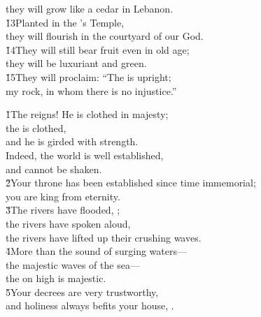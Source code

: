 \begin{poetry}
\poemll    they will grow like a cedar in Lebanon. \\
\poeml \v{13}Planted in the 's Temple, \\
\poemll    they will flourish in the courtyard of our God. \\
\poeml \v{14}They will still bear fruit even in old age; \\
\poemll    they will be luxuriant and green. \\
\poeml \v{15}They will proclaim: ``The  is upright; \\
\poemll    my rock, in whom there is no injustice.''
\end{poetry}

\begin{poetry}
\poeml \v{1}The  reigns! He is clothed in majesty; \\
\poemll    the  is clothed, \\
\poemlll       and he is girded with strength. \\
\poeml Indeed, the world is well established, \\
\poemll    and cannot be shaken. \\
\poeml \v{2}Your throne has been established since time immemorial; \\
\poemll    you are king from eternity. \\
\poeml \v{3}The rivers have flooded, ; \\
\poemll    the rivers have spoken aloud, \\
\poemlll       the rivers have lifted up their crushing waves. \\
\poeml \v{4}More than the sound of surging waters--- \\
\poemll    the majestic waves of the sea--- \\
\poemlll       the  on high is majestic. \\
\poeml \v{5}Your decrees are very trustworthy, \\
\poemll    and holiness always befits your house, .
\end{poetry}

